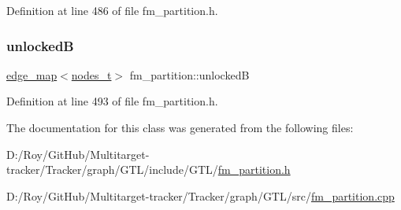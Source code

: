 Definition at line 486 of file fm\+\_\+partition.\+h.

\mbox{\label{classfm__partition_a74865bf3e6b6f73350c43c3ad9dfda96}} 
\subsubsection{\texorpdfstring{unlockedB}{unlockedB}}
{\footnotesize\ttfamily \mbox{\hyperlink{classedge__map}{edge\+\_\+map}}$<$\mbox{\hyperlink{edge_8h_a22ac17689106ba21a84e7bc54d1199d6}{nodes\+\_\+t}}$>$ fm\+\_\+partition\+::unlockedB\hspace{0.3cm}{\ttfamily [protected]}}



Definition at line 493 of file fm\+\_\+partition.\+h.



The documentation for this class was generated from the following files\+:\begin{DoxyCompactItemize}
\item 
D\+:/\+Roy/\+Git\+Hub/\+Multitarget-\/tracker/\+Tracker/graph/\+G\+T\+L/include/\+G\+T\+L/\mbox{\hyperlink{fm__partition_8h}{fm\+\_\+partition.\+h}}\item 
D\+:/\+Roy/\+Git\+Hub/\+Multitarget-\/tracker/\+Tracker/graph/\+G\+T\+L/src/\mbox{\hyperlink{fm__partition_8cpp}{fm\+\_\+partition.\+cpp}}\end{DoxyCompactItemize}
